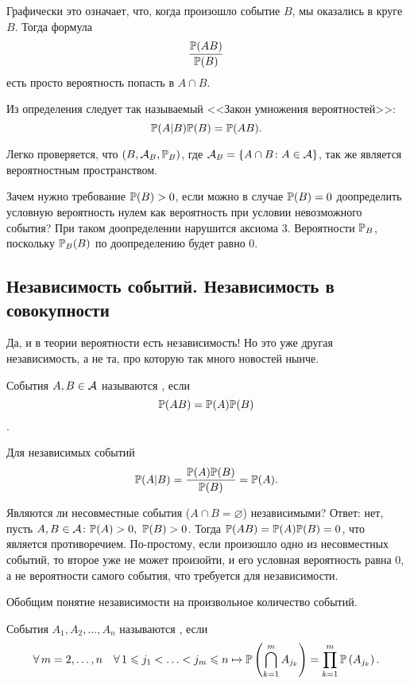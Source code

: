 \documentclass[../TV&MS.tex]{subfiles}
\begin{document}
\noindent
\parbox[b][3 cm][t]{40mm}{}
\hfill
\parbox[b][3 cm][t]{80mm}{
	Графически это означает, что, когда произошло событие $B$, мы оказались в круге $B$. 
	Тогда формула $$\frac{\mathbb{P}(AB)}{\mathbb{P}(B)}$$ есть просто вероятность попасть в $A\cap B$.
}

\newpage

Из определения следует так называемый <<Закон умножения вероятностей>>:
$$\mathbb{P}(A|B)\mathbb{P}(B)=\mathbb{P}(AB).$$

Легко проверяется, что $(B, \mathcal{A}_B, \mathbb{P}_B)$, где $\mathcal{A}_B = \left\{ A \cap B \colon A \in \mathcal{A} \right\}$, 
так же является вероятностным пространством. \\
\begin{Wtf}
Зачем нужно требование $\mathbb{P}(B) > 0$, если можно в случае $\mathbb{P}(B) = 0$ доопределить 
условную вероятность нулем как вероятность при условии невозможного события?
При таком доопределении нарушится аксиома $3$. Вероятности $\mathbb{P}_B$, поскольку $\mathbb{P}_B(B)$ 
по доопределению будет равно $0$.
\end{Wtf}

\subsection{Независимость событий. Независимость в совокупности}

\qquad Да, и в теории вероятности есть независимость! Но это уже другая независимость, 
а не та, про которую так много новостей нынче.

\begin{Def}
События $A, B \in \mathcal{A}$ называются , если 
$$\mathbb{P}(AB) = \mathbb{P}(A) \mathbb{P}(B)$$.
\end{Def}

Для независимых событий $$\mathbb{P}(A|B) = \frac{\mathbb{P}(A)\mathbb{P}(B)}{\mathbb{P}(B)} = \mathbb{P}(A).$$

\begin{Ex}
Являются ли несовместные события ($A\cap B = \varnothing$) независимыми? 
Ответ: нет, пусть  $A, B \in \mathcal{A} \colon \mathbb{P}(A) > 0, \ \mathbb{P}(B) > 0$. 
Тогда $\mathbb{P}(AB) = \mathbb{P}(A)\mathbb{P}(B) = 0$, что является противоречием. По-простому, 
если произошло одно из несовместных событий, то второе уже не может произойти, 
и его условная вероятность равна $0$, а не вероятности самого события, 
что требуется для независимости.
\end{Ex}

Обобщим понятие независимости на произвольное количество событий.

\begin{Def}
События $A_1, A_2, \dots, A_n$ называются , если 
$$\forall\, m = 2, \dots, n \quad \forall\, 1 \leqslant j_1 < \ldots < j_m \leqslant n \mapsto 
\mathbb{P}\left(\bigcap_{k=1}^{m}A_{j_k}\right)=\prod_{k=1}^{m} \mathbb{P}\left(A_{j_k}\right).$$
\end{Def}
\end{document}

